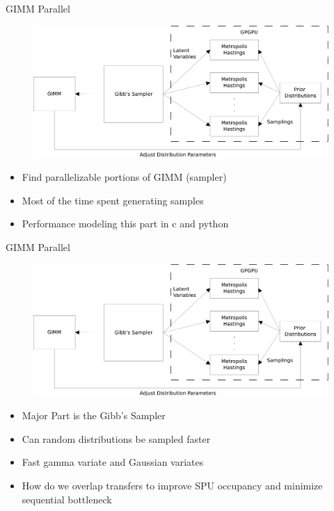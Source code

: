 \documentclass{beamer}
\begin{document}
\begin{frame}{GIMM Parallel}
\begin{figure}
  \centering \includegraphics[scale=.20]{doc/GIMM}
\end{figure}
 \begin{itemize}
  \item Find parallelizable portions of GIMM (sampler)
  \item Most of the time spent generating samples
  \item Performance modeling this part in c and python
  \end{itemize}
  \end{frame}
  
 \begin{frame}{GIMM Parallel}
\begin{figure}
  \centering \includegraphics[scale=.20]{doc/GIMM}
\end{figure}
 \begin{itemize}
  \item Major Part is the Gibb's Sampler
  \item Can random distributions be sampled faster
  \item Fast gamma variate and Gaussian variates
  \item How do we overlap transfers to improve SPU occupancy and minimize sequential bottleneck
  \end{itemize}
\end{frame}
\end{document}
